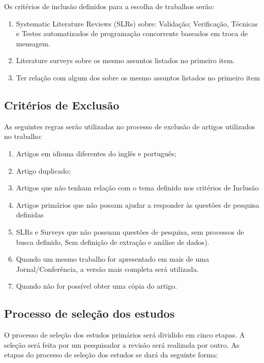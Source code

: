 Os critérios de inclusão definidos para a escolha de trabalhos serão:

\begin{enumerate}[label=CI\arabic*:]
    \item Systematic Literature Reviews (SLRs) sobre: Validação; Verificação, Técnicas e Testes automatizados de programação concorrente baseados em troca de mensagem.
    \item Literature surveys sobre os mesmo assuntos listados no primeiro item.
    \item Ter relação com algum dos sobre os mesmo assuntos listados no primeiro item
\end{enumerate}


\subsection{Critérios de Exclusão}

As seguintes regras serão utilizadas no processo de exclusão de artigos utilizados no trabalho:

\begin{enumerate}[label=CE\arabic*:]
    \item Artigos em idioma diferentes do inglês e português;
    \item Artigo duplicado;
    \item Artigos que não tenham relação com o tema definido nos critérios de Inclusão
    \item Artigos primários que não possam ajudar a responder às questões de pesquisa definidas
    \item SLRs e Surveys que não possuam questões de pesquisa, sem processos de busca definido, Sem definição de extração e análise de dados). 
    \item Quando um mesmo trabalho for apresentado em mais de uma Jornal/Conferência, a versão mais completa será utilizada.
    \item Quando não for possível obter uma cópia do artigo.
\end{enumerate}

\subsection{Processo de seleção dos estudos}

O processo de seleção dos estudos primários será dividido em cinco etapas. A seleção será feita por um pesquisador a revisão será realizada por outro. As etapas do processo de seleção dos estudos se dará da seguinte forma:


